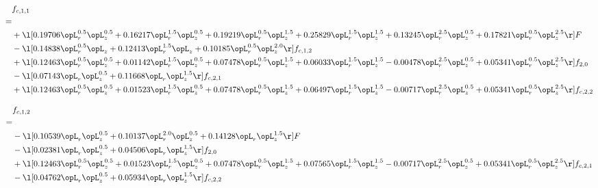 \begin{alignat}{2} 
\label{eq:f_11_2} 
& f_{c,1,1} \nonumber \\ 
 = \\ 
& + \l[  0.19706 \opL_r^{0.5} \opL_z^{0.5} +  0.16217 \opL_r^{1.5} \opL_z^{0.5} +  0.19219 \opL_r^{0.5} \opL_z^{1.5} +  0.25829 \opL_r^{1.5} \opL_z^{1.5} +  0.13245 \opL_r^{2.5} \opL_z^{0.5} +  0.17821 \opL_r^{0.5} \opL_z^{2.5}  \r] F \nonumber \\ 
& - \l[  0.14838 \opL_r^{0.5} \opL_z +  0.12413 \opL_r^{1.5} \opL_z +  0.10185 \opL_r^{0.5} \opL_z^{2.0}  \r] f_{c,1,2} \nonumber \\ 
& + \l[  0.12463 \opL_r^{0.5} \opL_z^{0.5} +  0.01142 \opL_r^{1.5} \opL_z^{0.5} +  0.07478 \opL_r^{0.5} \opL_z^{1.5} +  0.06033 \opL_r^{1.5} \opL_z^{1.5}   -0.00478 \opL_r^{2.5} \opL_z^{0.5} +  0.05341 \opL_r^{0.5} \opL_z^{2.5}  \r] f_{2,0} \nonumber \\ 
& - \l[  0.07143 \opL_r \opL_z^{0.5} +  0.11668 \opL_r \opL_z^{1.5}  \r] f_{c,2,1} \nonumber \\ 
& + \l[  0.12463 \opL_r^{0.5} \opL_z^{0.5} +  0.01523 \opL_r^{1.5} \opL_z^{0.5} +  0.07478 \opL_r^{0.5} \opL_z^{1.5} +  0.06497 \opL_r^{1.5} \opL_z^{1.5}   -0.00717 \opL_r^{2.5} \opL_z^{0.5} +  0.05341 \opL_r^{0.5} \opL_z^{2.5}  \r] f_{c,2,2} \nonumber \\ 
\end{alignat} 


\begin{alignat}{2} 
\label{eq:f_12_2} 
& f_{c,1,2} \nonumber \\ 
 = \\ 
& - \l[  0.10539 \opL_r \opL_z^{0.5} +  0.10137 \opL_r^{2.0} \opL_z^{0.5} +  0.14128 \opL_r \opL_z^{1.5}  \r] F \nonumber \\ 
& - \l[  0.02381 \opL_r \opL_z^{0.5} +  0.04506 \opL_r \opL_z^{1.5}  \r] f_{2,0} \nonumber \\ 
& + \l[  0.12463 \opL_r^{0.5} \opL_z^{0.5} +  0.01523 \opL_r^{1.5} \opL_z^{0.5} +  0.07478 \opL_r^{0.5} \opL_z^{1.5} +  0.07565 \opL_r^{1.5} \opL_z^{1.5}   -0.00717 \opL_r^{2.5} \opL_z^{0.5} +  0.05341 \opL_r^{0.5} \opL_z^{2.5}  \r] f_{c,2,1} \nonumber \\ 
& - \l[  0.04762 \opL_r \opL_z^{0.5} +  0.05934 \opL_r \opL_z^{1.5}  \r] f_{c,2,2} \nonumber \\ 
\end{alignat} 


